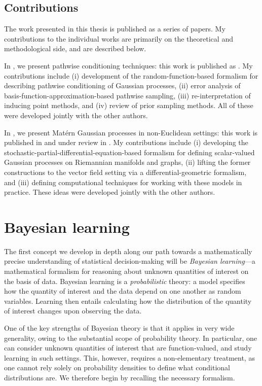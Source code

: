 \documentclass[11pt]{book}
\begin{document}
\subsection*{Contributions}

The work presented in this thesis is published as a series of papers.
My contributions to the individual works are primarily on the theoretical and methodological side, and are described below.

In , we present pathwise conditioning techniques: this work is published as \textcite{wilson20,wilson21}.
My contributions include (i) development of the random-function-based formalism for describing pathwise conditioning of Gaussian processes, (ii) error analysis of basis-function-approximation-based pathwise sampling, (iii) re-interpretation of inducing point methods, and (iv) review of prior sampling methods.
All of these were developed jointly with the other authors. 

In , we present Matérn Gaussian processes in non-Euclidean settings: this work is published in \textcite{borovitskiy20,borovitskiy21} and under review in \textcite{hutchinson21}.
My contributions include (i) developing the stochastic-partial-differential-equation-based formalism for defining scalar-valued Gaussian processes on Riemannian manifolds and graphs, (ii) lifting the former constructions to the vector field setting via a differential-geometric formalism, and (iii) defining computational techniques for working with these models in practice.
These ideas were developed jointly with the other authors.


\section{Bayesian learning}

The first concept we develop in depth along our path towards a mathematically precise understanding of statistical decision-making will be \emph{Bayesian learning}---a mathematical formalism for reasoning about unknown quantities of interest on the basis of data.
Bayesian learning is a \emph{probabilistic} theory: a model specifies how the quantity of interest and the data depend on one another as random variables.
Learning then entails calculating how the distribution of the quantity of interest changes upon observing the data.

One of the key strengths of Bayesian theory is that it applies in very wide generality, owing to the substantial scope of probability theory. 
In particular, one can consider unknown quantities of interest that are function-valued, and study learning in such settings.
This, however, requires a non-elementary treatment, as one cannot rely solely on probability densities to define what conditional distributions are.
We therefore begin by recalling the necessary formalism.
\end{document}
